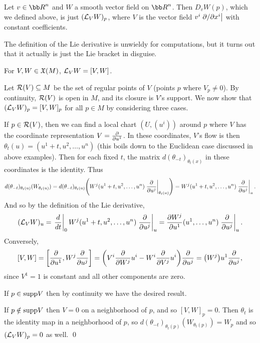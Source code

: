 \eproof

\bexam

    Let $v\in\bR^n$ and $W$ a smooth vector field on $\bR^n$.
    Then $D_vW(p)$, which we defined above, is just $({{\cal L}}_VW)_p$, where $V$ is the vector field $v^i\left.\partial /\partial x^i\right|$ with constant coefficients.

\eexam

The definition of the Lie derivative is unwieldy for computations, but it turns out that it actually is just the Lie bracket in disguise.

\bthrm

    For $V,W\in{\frak X}(M)$, ${{\cal L}}_VW=[V,W]$.

\ethrm

\bproof

    Let ${\cal R}(V)\subseteq M$ be the set of regular points of $V$ (points $p$ where $V_p\neq0$).
    By continuity, ${\cal R}(V)$ is open in $M$, and its closure is $V$'s support.
    We now show that $({{\cal L}}_VW)_p=[V,W]_p$ for all $p\in M$ by considering three cases.

    \benum
        \item If $p\in{\cal R}(V)$, then we can find a local chart $(U,(u^i))$ around $p$ where $V$ has the coordinate representation $V={{\partial }\over{\partial u^1}}$.
        In these coordinates, $V$'s flow is then $\theta_t(u)=(u^1+t,u^2,\dots,u^n)$ (this boils down to the Euclidean case discussed in above examples).
        Then for each fixed $t$, the matrix $d(\theta_{-t})_{\theta_t(x)}$ in these coordinates is the identity.
        Thus
        $$ d(\theta_{-t})_{\theta_t(u)}(W_{\theta_t(u)}) = d(\theta_{-t})_{\theta_t(u)}\mathopen{}\mathclose{\left(W^j(u^1+t,u^2,\dots,u^n)\left.{{\partial }\over{\partial u^j}}\right|_{\theta_t(u)}\right)}
        = W^j(u^1+t,u^2,\dots,u^n)\left.{{\partial }\over{\partial u^j}}\right|_u . $$
        And so by the definition of the Lie derivative,
        $$ ({{\cal L}}_VW)_u = \left.{{d}\over{dt}}\right|_0 W^j(u^1+t,u^2,\dots,u^n)\left.{{\partial }\over{\partial u^j}}\right|_u = {{\partial W^j}\over{\partial u^1}}(u^1,\dots,u^n)\left.{{\partial }\over{\partial u^j}}\right|_u . $$
        Conversely,
        $$ [V,W] = \mathopen{}\mathclose{\left[{{\partial }\over{\partial u^1}},W^j{{\partial }\over{\partial u^j}}\right]} = \mathopen{}\mathclose{\left(V^i{{\partial }\over{\partial W^j}}{u^i} - W^i{{\partial }\over{\partial V^j}}{u^i}\right)}{{\partial }\over{\partial u^j}} = \mathopen{}\mathclose{\left(W^j\right)}{u^1}{{\partial }\over{\partial u^j}} , $$
        since $V^1=1$ is constant and all other components are zero.

        \item If $p\in{\rm supp} V$ then by continuity we have the desired result.

        \item If $p\notin{\rm supp} V$ then $V=0$ on a neighborhood of $p$, and so $[V,W]_p=0$.
        Then $\theta_t$ is the identity map in a neighborhood of $p$, so $d(\theta_{-t})_{\theta_t(p)}(W_{\theta_t(p)})=W_p$ and so $({{\cal L}}_VW)_p=0$ as well.
        \qed
    \eenum


